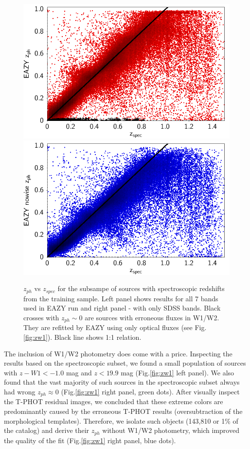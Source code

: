 \documentclass[apj,iop]{emulateapj}
\begin{document}
\begin{figure}[!ht]
\includegraphics[width=0.5\linewidth]{figures/eazy_spec1.png}
\includegraphics[width=0.5\linewidth]{figures/eazy_nowise_spec.png}
\caption{$z_{ph}$ vs $z_{spec}$ for the subsampe of sources with spectroscopic redshifts from the training sample. Left panel shows results for all 7 bands used in EAZY run and right panel - with only SDSS bands. Black crosses with $z_{ph}\sim 0$ are sources with erroneous fluxes in W1/W2. They are refitted by EAZY using only optical fluxes (see Fig.\ref{fig:zw1}). Black line shows 1:1 relation. }
\label{fig:eazy_photo_spec}
\end{figure}


The inclusion of W1/W2 photometry does come with a price. Inspecting the results based on the spectroscopic subset, we found a small population of sources with $z-W1<-1.0$ mag and $z<19.9$ mag (Fig.\ref{fig:zw1} left panel). We also found that the vast majority of such sources in the spectroscopic subset always had wrong $z_{ph} \approx 0$ (Fig.\ref{fig:zw1} right panel, green dots). After visually inspect the T-PHOT residual images, we concluded that these extreme colors are predominantly caused by the erroneous T-PHOT results (oversubtraction of the morphological templates). Therefore, we isolate such objects (143,810 or 1\% of the catalog) and derive their $z_{ph}$ without W1/W2 photometry, which improved the quality of the fit (Fig.\ref{fig:zw1} right panel, blue dots).
\end{document}
